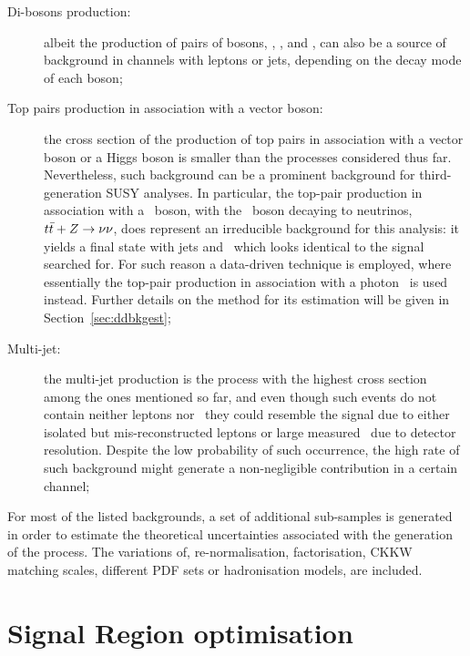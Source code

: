 \begin{description}
			\item [Di-bosons production:] albeit the production of pairs of bosons, \Wboson\Wboson, \Wboson\Zboson, and \Zboson\Zboson, can also be a source of background in channels with leptons or jets, depending on the decay mode of each boson;

			\item [Top pairs production in association with a vector boson:] the cross section of the production of top pairs in association with a vector boson or a Higgs boson is smaller than the processes considered thus far. Nevertheless, such background can be a prominent background for third-generation \ac{SUSY} analyses. In particular, the top-pair production in association with a \Zboson\ boson, with the \Zboson\ boson decaying to neutrinos, $t\bar{t}+Z \rightarrow \nu \nu$, does represent an irreducible background for this analysis: it yields a final state with jets and \met\ which looks identical to the signal searched for. For such reason a data-driven technique is employed, where essentially the top-pair production in association with a photon \ttgamma\ is used instead. Further details on the method for its estimation will be given in Section~\ref{sec:ddbkgest}; 

			\item [Multi-jet:] the multi-jet production is the process with the highest cross section among the ones mentioned so far, and even though such events do not contain neither leptons nor \met\ they could resemble the signal due to either isolated but mis-reconstructed leptons or large measured \met\ due to detector resolution. Despite the low probability of such occurrence, the high rate of such background might generate a non-negligible contribution in a certain channel;
		\end{description}

		For most of the listed backgrounds, a set of additional sub-samples is generated in order to estimate the theoretical uncertainties associated with the generation of the process. The variations of, re-normalisation, factorisation, CKKW matching scales, different PDF sets or hadronisation models, are included.






	
	\section{Signal Region optimisation}
	\label{sec:SRs}

